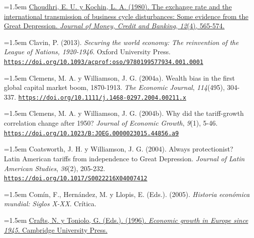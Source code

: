 \documentclass[10pt,a4paper]{article}
\begin{document}
{\sloppy\noindent\hangindent=1.5em \href{https://econpapers.repec.org/RePEc:mcb:jmoncb:v:12:y:1980:i:4:p:565-74}{Choudhri, E. U. y Kochin, L. A. (1980). The exchange rate and the international transmission of business cycle disturbances: Some evidence from the Great Depression. \textit{Journal of Money, Credit and Banking}, \textit{12}(4), 565-574.}\par}

{\sloppy\noindent\hangindent=1.5em Clavin, P. (2013). \textit{Securing the world economy: The reinvention of the League of Nations, 1920-1946}. Oxford University Press. \href{https://doi.org/10.1093/acprof:oso/9780199577934.001.0001}{\nolinkurl{https://doi.org/10.1093/acprof:oso/9780199577934.001.0001}}\par}

{\sloppy\noindent\hangindent=1.5em Clemens, M. A. y Williamson, J. G. (2004a). Wealth bias in the first global capital market boom, 1870-1913. \textit{The Economic Journal}, \textit{114}(495), 304-337. \href{https://doi.org/10.1111/j.1468-0297.2004.00211.x}{\nolinkurl{https://doi.org/10.1111/j.1468-0297.2004.00211.x}}\par}

{\sloppy\noindent\hangindent=1.5em Clemens, M. A. y Williamson, J. G. (2004b). Why did the tariff-growth correlation change after 1950? \textit{Journal of Economic Growth}, \textit{9}(1), 5-46. \href{https://doi.org/10.1023/B:JOEG.0000023015.44856.a9}{\nolinkurl{https://doi.org/10.1023/B:JOEG.0000023015.44856.a9}}\par}

{\sloppy\noindent\hangindent=1.5em Coatsworth, J. H. y Williamson, J. G. (2004). Always protectionist? Latin American tariffs from independence to Great Depression. \textit{Journal of Latin American Studies}, \textit{36}(2), 205-232. \href{https://doi.org/10.1017/S0022216X04007412}{\nolinkurl{https://doi.org/10.1017/S0022216X04007412}}\par}

{\sloppy\noindent\hangindent=1.5em Comín, F., Hernández, M. y Llopis, E. (Eds.). (2005). \textit{Historia económica mundial: Siglos X-XX}. Crítica.\par}

{\sloppy\noindent\hangindent=1.5em \href{https://econpapers.repec.org/RePEc:cup:cbooks:9780521499644}{Crafts, N. y Toniolo, G. (Eds.). (1996). \textit{Economic growth in Europe since 1945}. Cambridge University Press.}\par}
\end{document}
